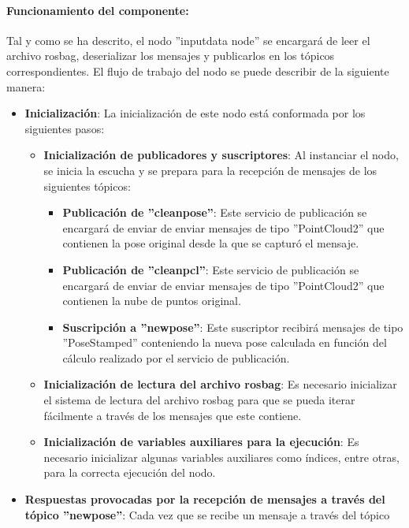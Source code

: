 \documentclass[12pt, a4paper, twoside]{article}
\begin{document}
\paragraph{Funcionamiento del componente:}
Tal y como se ha descrito, el nodo ''input\textunderscore data \textunderscore node'' se encargará de leer el archivo rosbag, deserializar los mensajes y
publicarlos en los tópicos correspondientes. El flujo de trabajo del nodo se puede describir de la siguiente manera:
\begin{itemize}
  \item \textbf{Inicialización}: La inicialización de este nodo está conformada por los siguientes pasos:
  \begin{itemize}
    \item \textbf{Inicialización de publicadores y suscriptores}: Al instanciar el nodo, se inicia la escucha y se prepara para la recepción de mensajes de los 
    siguientes tópicos:
    \begin{itemize}
      \item \textbf{Publicación de ''clean\textunderscore pose''}: Este servicio de publicación se encargará de enviar de enviar mensajes de tipo ''PointCloud2'' que 
      contienen la pose original desde la que se capturó el mensaje.
      \item \textbf{Publicación de ''clean\textunderscore pcl''}: Este servicio de publicación se encargará de enviar de enviar mensajes de tipo ''PointCloud2'' que 
      contienen la nube de puntos original.
      \item \textbf{Suscripción a ''new\textunderscore pose''}: Este suscriptor recibirá mensajes de tipo ''PoseStamped'' conteniendo la nueva pose calculada en función 
      del cálculo realizado por el servicio de publicación.
    \end{itemize}
    \item \textbf{Inicialización de lectura del archivo rosbag}: Es necesario inicializar el sistema de lectura del archivo rosbag para que se pueda iterar fácilmente
    a través de los mensajes que este contiene.
    \item \textbf{Inicialización de variables auxiliares para la ejecución}: Es necesario inicializar algunas variables auxiliares como índices, entre otras,  
    para la correcta ejecución del nodo.
  \end{itemize}
  \item \textbf{Respuestas provocadas por la recepción de mensajes a través del tópico ''new\textunderscore pose''}: Cada vez que se recibe un mensaje a través del tópico 

\end{itemize}
\end{document}

